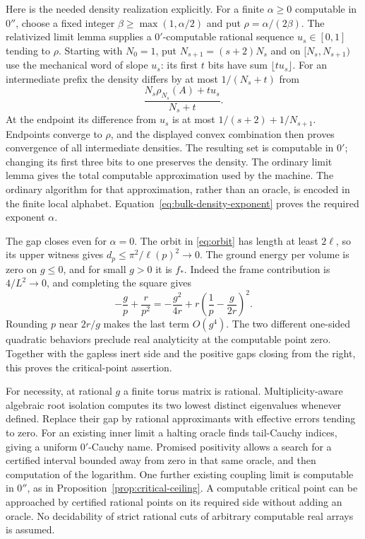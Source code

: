Here is the needed density realization explicitly. For a finite
$\alpha\geq0$ computable in $0''$, choose a fixed integer
$\beta\geq\max(1,\alpha/2)$ and put $\rho=\alpha/(2\beta)$.
The relativized limit lemma supplies a $0'$-computable rational
sequence $u_s\in[0,1]$ tending to $\rho$. Starting with $N_0=1$,
put $N_{s+1}=(s+2)N_s$ and on $[N_s,N_{s+1})$ use the mechanical
word of slope $u_s$: its first $t$ bits have sum $\lfloor tu_s\rfloor$.
For an intermediate prefix the density differs by at most
$1/(N_s+t)$ from
\[
 \frac{N_s\rho_{N_s}(A)+tu_s}{N_s+t}.
\]
At the endpoint its difference from $u_s$ is at most
$1/(s+2)+1/N_{s+1}$. Endpoints converge to $\rho$, and the displayed
convex combination then proves convergence of all intermediate
densities. The resulting set is computable in $0'$; changing its
first three bits to one preserves the density. The ordinary limit
lemma gives the total computable approximation used by the machine.
The ordinary algorithm for that approximation, rather than an oracle,
is encoded in the finite local alphabet. Equation~\eqref{eq:bulk-density-exponent}
proves the required exponent $\alpha$.

The gap closes even for $\alpha=0$. The orbit in
\eqref{eq:orbit} has length at least $2\ell$, so its upper witness
gives $d_p\leq\pi^2/\ell(p)^2\to0$. The ground energy per volume is
zero on $g\leq0$, and for small $g>0$ it is $f_*$. Indeed the
frame contribution is $4/L^2\to0$, and completing the square gives
\[
 -\frac gp+\frac r{p^2}
 =-\frac{g^2}{4r}+r\left(\frac1p-\frac g{2r}\right)^2.
\]
Rounding $p$ near $2r/g$ makes the last term $O(g^4)$.
The two different one-sided quadratic behaviors preclude real
analyticity at the computable point zero. Together with the gapless
inert side and the positive gaps closing from the right, this proves
the critical-point assertion.

For necessity, at rational $g$ a finite torus matrix is rational.
Multiplicity-aware algebraic root isolation computes its two lowest
distinct eigenvalues whenever defined. Replace their gap by rational
approximants with effective errors tending to zero. For an existing
inner limit a halting oracle finds tail-Cauchy indices, giving a
uniform $0'$-Cauchy name. Promised positivity allows a search for a
certified interval bounded away from zero in that same oracle, and
then computation of the logarithm. One further existing coupling
limit is computable in $0''$, as in
Proposition~\ref{prop:critical-ceiling}. A computable critical point
can be approached by certified rational points on its required side
without adding an oracle. No decidability of strict rational cuts of
arbitrary computable real arrays is assumed.

